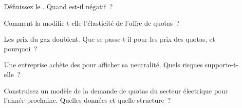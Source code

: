 \begin{interviewq}\label{iq:m3:emissions-and-environmental-markets:2}
Définissez le . Quand est-il négatif~?
\end{interviewq}

\begin{interviewq}\label{iq:m3:emissions-and-environmental-markets:3}
Comment la  modifie-t-elle l'élasticité de l'offre de quotas~?
\end{interviewq}

\begin{interviewq}\label{iq:m3:emissions-and-environmental-markets:4}
Les prix du gaz doublent. Que se passe-t-il pour les prix des quotas, et pourquoi~?
\end{interviewq}

\begin{interviewq}\label{iq:m3:emissions-and-environmental-markets:5}
Une entreprise achète des  pour afficher sa neutralité. Quels risques supporte-t-elle~?
\end{interviewq}

\begin{interviewq}\label{iq:m3:emissions-and-environmental-markets:6}
Construisez un modèle de la demande de quotas du secteur électrique pour l'année prochaine. Quelles données et quelle structure~?
\end{interviewq}

